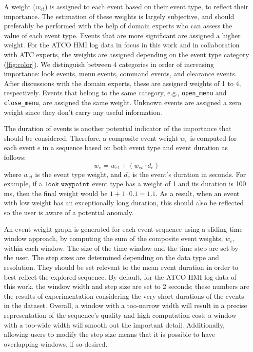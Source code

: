 \documentclass[camera]{vgtc}                          %
\begin{document}
A weight ($w_{et}$) is assigned to each event based on their event type, to reflect their importance.
The estimation of these weights is largely subjective, and should preferably be performed with the help of domain experts who can assess the value of each event type. 
Events that are more significant are assigned a higher weight.
For the ATCO HMI log data in focus in this work and in collaboration with ATC experts, the weights are assigned depending on the event type category (\autoref{fig:color}). We distinguish between 4 categories in order of increasing importance: look events, menu events, command events, and clearance events. After discussions with the domain experts, these are assigned weights of 1 to 4, respectively. 
Events that belong to the same category, e.g., \texttt{open\_menu} and \texttt{close\_menu}, are assigned the same weight. Unknown events are assigned a zero weight since they don't carry any useful information.

The duration of events is another potential indicator of the importance that should be considered. 
Therefore, a composite event weight $ w_e $ is computed for each event $ e $ in a sequence based on both event type and event duration as follows:
\begin{equation}
w_e = w_{et} + (w_{et} \cdot d_e)
\end{equation}
where $ w_{et} $ is the event type weight, and $ d_e $ is the event's duration in seconds. For example, if a $ \texttt{look\_waypoint} $ event type has a weight of 1 and its duration is 100 ms, then the final weight would be $ 1 + 1 \cdot 0.1 = 1.1 $. As a result, when an event with low weight has an exceptionally long duration, this should also be reflected so the user is aware of a potential anomaly.

An event weight graph is generated for each event sequence using a sliding time window approach, by computing the sum of the composite event weights, $ w_e $, within each window.
The size of the time window and the time step are set by the user. The step sizes are determined depending on the data type and resolution. They should be set relevant to the mean event duration in order to best reflect the explored sequence. By default, for the ATCO HMI log data of this work, the window width and step size are set to 2 seconds; these numbers are the results of experimentation considering the very short durations of the events in the dataset. 
Overall, a window with a too-narrow width will result in a precise representation of the sequence's quality and high computation cost; a window with a too-wide width will smooth out the important detail. Additionally, allowing users to modify the step size means that it is possible to have overlapping windows, if so desired. 
\end{document}
